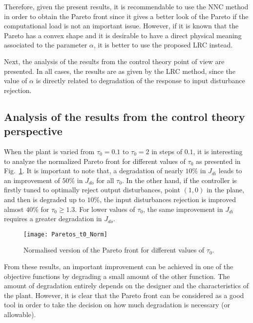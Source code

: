 Therefore, given the present results, it is recommendable to use the NNC method in order to obtain the Pareto front since it gives a better look of the Pareto if the computational load is not an important issue. However, if it is known that the Pareto has a convex shape and it is desirable to have a direct physical meaning associated to the parameter $\alpha$, it is better to use the proposed LRC instead.

Next, the analysis of the results from the control theory point of view are presented. In all cases, the results are as given by the LRC method, since the value of $\alpha$ is directly related to degradation of the response to input disturbance rejection.

\subsection{Analysis of the results from the control theory perspective}
\label{sec:Control}
%
When the plant is varied from $\tau_0=0.1$ to $\tau_0=2$ in steps of $0.1$, %
%
it is interesting to analyze the normalized Pareto front for different values of $\tau_0$ as presented in  Fig.~\ref{fig:Paretos_t0_Norm}. %
It is important to note that, a degradation of nearly $10\%$ in $J_{di}$ leads to an improvement of $50\%$ in $J_{do}$ for all $\tau_0$. In the other hand, if the controller is firstly tuned to optimally reject output disturbances, point $(1,0)$ in the plane, and then is degraded up to $10\%$, the input disturbances rejection is improved almost $40\%$ for $\tau_0 \geq 1.3$. For lower values of $\tau_0$, the same improvement in $J_{di}$ requires a greater degradation in $J_{do}$.
\begin{figure}%
	\centering
	\texttt{[image: Paretos\_t0\_Norm]}%
	\caption{Normalised version of the Pareto front for different values of $\tau_0$.}%
	\label{fig:Paretos_t0_Norm}%
\end{figure}
%
From these results, an important improvement can be achieved in one of the objective functions by degrading a small amount of the other function. The amount of degradation entirely depends on the designer and the characteristics of the plant. However, it is clear that the Pareto front can be considered as a good tool in order to take the decision on how much degradation is necessary (or allowable). 

